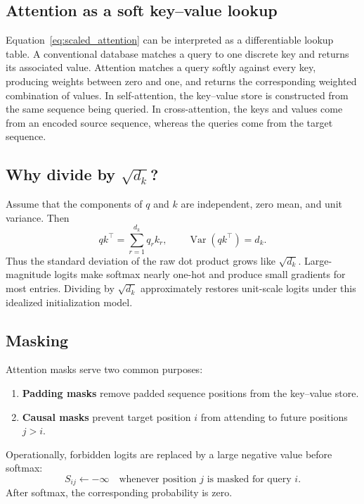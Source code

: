 \documentclass[11pt]{article}
\begin{document}
\subsection{Attention as a soft key--value lookup}

Equation~\eqref{eq:scaled_attention} can be interpreted as a differentiable lookup table. A conventional database matches a query to one discrete key and returns its associated value. Attention matches a query softly against every key, producing weights between zero and one, and returns the corresponding weighted combination of values. In self-attention, the key--value store is constructed from the same sequence being queried. In cross-attention, the keys and values come from an encoded source sequence, whereas the queries come from the target sequence.

\subsection{Why divide by $\sqrt{d_k}$?}

Assume that the components of $q$ and $k$ are independent, zero mean, and unit variance. Then
\begin{equation}
  qk^\top=\sum_{r=1}^{d_k}q_rk_r,
  \qquad
  \operatorname{Var}(qk^\top)=d_k.
\end{equation}
Thus the standard deviation of the raw dot product grows like $\sqrt{d_k}$. Large-magnitude logits make softmax nearly one-hot and produce small gradients for most entries. Dividing by $\sqrt{d_k}$ approximately restores unit-scale logits under this idealized initialization model.

\subsection{Masking}

Attention masks serve two common purposes:
\begin{enumerate}[label=(\alph*)]
  \item \textbf{Padding masks} remove padded sequence positions from the key--value store.
  \item \textbf{Causal masks} prevent target position $i$ from attending to future positions $j>i$.
\end{enumerate}
Operationally, forbidden logits are replaced by a large negative value before softmax:
\begin{equation}
  S_{ij}\leftarrow -\infty
  \quad\text{whenever position $j$ is masked for query $i$.}
\end{equation}
After softmax, the corresponding probability is zero.
\end{document}
